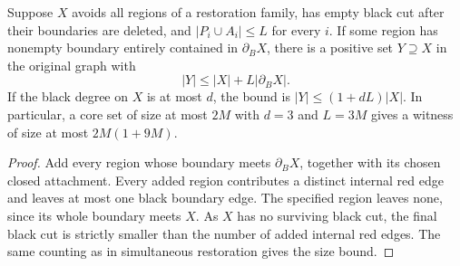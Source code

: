 \begin{theorem}
  \label{thm:lowerbounds-algebraic-closed-core-positive}
  \leanok
  Suppose $X$ avoids all regions of a restoration family, has empty black
  cut after their boundaries are deleted, and $|P_i\cup A_i|\le L$ for
  every $i$. If some region has nonempty boundary entirely contained in
  $\partial_B X$, there is a positive set $Y\supseteq X$ in the original
  graph with
  \[
    |Y|\le |X|+L|\partial_B X|.
  \]
  If the black degree on $X$ is at most $d$, the bound is
  $|Y|\le(1+dL)|X|$. In particular, a core set of size at most $2M$
  with $d=3$ and $L=3M$ gives a witness of size at most $2M(1+9M)$.
\end{theorem}
\begin{proof}
  \leanok
  Add every region whose boundary meets $\partial_B X$, together with
  its chosen closed attachment. Every added region contributes a distinct
  internal red edge and leaves at most one black boundary edge. The
  specified region leaves none, since its whole boundary meets $X$.
  As $X$ has no surviving black cut, the final black cut is strictly
  smaller than the number of added internal red edges. The same counting
  as in simultaneous restoration gives the size bound.
\end{proof}

